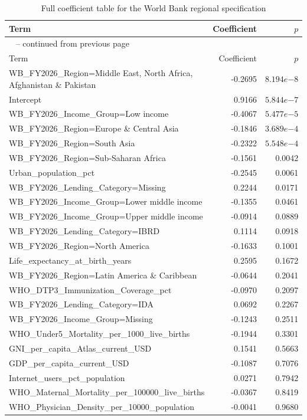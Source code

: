 \documentclass[runningheads]{llncs}
\begin{document}
{\begin{longtable}{p{}r@{\hspace{1.5em}}r}
\caption{Full coefficient table for the World Bank regional specification}\label{tab:appendix-coefficients-wb}\\
\hline
Term & Coefficient & $p$ \\
\hline
\endfirsthead
\multicolumn{3}{l}{\tablename\ \thetable{} -- continued from previous page}\\
\hline
Term & Coefficient & $p$ \\
\hline
\endhead
WB\_FY2026\_Region=Middle East, North Africa, Afghanistan \& Pakistan & -0.2695 & $8.194e{-8}$ \\
Intercept & 0.9166 & $5.844e{-7}$ \\
WB\_FY2026\_Income\_Group=Low income & -0.4067 & $5.477e{-5}$ \\
WB\_FY2026\_Region=Europe \& Central Asia & -0.1846 & $3.689e{-4}$ \\
WB\_FY2026\_Region=South Asia & -0.2322 & $5.548e{-4}$ \\
WB\_FY2026\_Region=Sub-Saharan Africa & -0.1561 & 0.0042 \\
Urban\_population\_pct & -0.2545 & 0.0061 \\
WB\_FY2026\_Lending\_Category=Missing & 0.2244 & 0.0171 \\
WB\_FY2026\_Income\_Group=Lower middle income & -0.1355 & 0.0461 \\
WB\_FY2026\_Income\_Group=Upper middle income & -0.0914 & 0.0889 \\
WB\_FY2026\_Lending\_Category=IBRD & 0.1114 & 0.0918 \\
WB\_FY2026\_Region=North America & -0.1633 & 0.1001 \\
Life\_expectancy\_at\_birth\_years & 0.2595 & 0.1672 \\
WB\_FY2026\_Region=Latin America \& Caribbean & -0.0644 & 0.2041 \\
WHO\_DTP3\_Immunization\_Coverage\_pct & -0.0970 & 0.2097 \\
WB\_FY2026\_Lending\_Category=IDA & 0.0692 & 0.2267 \\
WB\_FY2026\_Income\_Group=Missing & -0.1243 & 0.2511 \\
WHO\_Under5\_Mortality\_per\_1000\_live\_births & -0.1944 & 0.3301 \\
GNI\_per\_capita\_Atlas\_current\_USD & 0.1541 & 0.5663 \\
GDP\_per\_capita\_current\_USD & -0.1087 & 0.7076 \\
Internet\_users\_pct\_population & 0.0271 & 0.7942 \\
WHO\_Maternal\_Mortality\_per\_100000\_live\_births & -0.0367 & 0.8419 \\
WHO\_Physician\_Density\_per\_10000\_population & -0.0041 & 0.9680 \\
\hline
\end{longtable}

}
\end{document}
